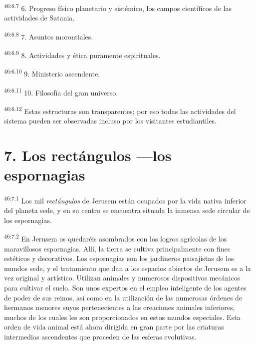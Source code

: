 \par
\textsuperscript{46:6.7} 6. Progreso físico planetario y sistémico, los campos científicos de las actividades de Satania.

\par
\textsuperscript{46:6.8} 7. Asuntos morontiales.

\par
\textsuperscript{46:6.9} 8. Actividades y ética puramente espirituales.

\par
\textsuperscript{46:6.10} 9. Ministerio ascendente.

\par
\textsuperscript{46:6.11} 10. Filosofía del gran universo.

\par
\textsuperscript{46:6.12} Estas estructuras son transparentes; por eso todas las actividades del sistema pueden ser observadas incluso por los visitantes estudiantiles.

\section*{7. Los rectángulos ---los espornagias}
\par
\textsuperscript{46:7.1} Los mil \textit{rectángulos} de Jerusem están ocupados por la vida nativa inferior del planeta sede, y en su centro se encuentra situada la inmensa sede circular de los espornagias.

\par
\textsuperscript{46:7.2} En Jerusem os quedaréis asombrados con los logros agrícolas de los maravillosos espornagias. Allí, la tierra se cultiva principalmente con fines estéticos y decorativos. Los espornagias son los jardineros paisajistas de los mundos sede, y el tratamiento que dan a los espacios abiertos de Jerusem es a la vez original y artístico. Utilizan animales y numerosos dispositivos mecánicos para cultivar el suelo. Son unos expertos en el empleo inteligente de los agentes de poder de sus reinos, así como en la utilización de las numerosas órdenes de hermanos menores suyos pertenecientes a las creaciones animales inferiores, muchos de los cuales les son proporcionados en estos mundos especiales. Esta orden de vida animal está ahora dirigida en gran parte por las criaturas intermedias ascendentes que proceden de las esferas evolutivas.


